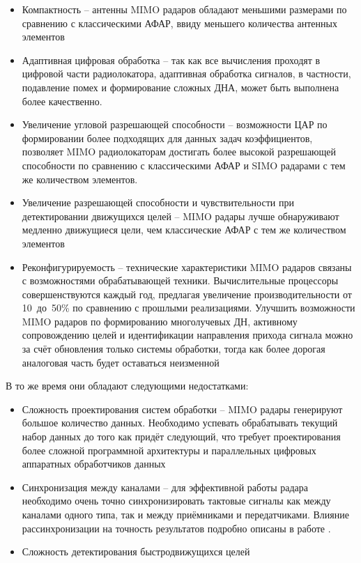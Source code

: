 \begin{itemize}
    \item Компактность -- антенны MIMO радаров обладают меньшими размерами по сравнению с классическими АФАР,
    ввиду меньшего количества антенных элементов 
    \item Адаптивная цифровая обработка -- так как все вычисления проходят в цифровой части радиолокатора, 
    адаптивная обработка сигналов, в частности, подавление помех и формирование сложных ДНА, 
    может быть выполнена более качественно. 
    \item Увеличение угловой разрешающей способности -- возможности ЦАР по формировании более подходящих 
    для данных задач коэффициентов, позволяет MIMO радиолокаторам достигать 
    более высокой разрешающей способности по сравнению с классическими АФАР и SIMO радарами с тем же количеством элементов.
    \item Увеличение разрешающей способности и чувствительности при детектировании движущихся целей -- 
    MIMO радары лучше обнаруживают медленно движущиеся цели, чем классические АФАР с тем же количеством элементов
    \item Реконфигурируемость -- технические характеристики MIMO радаров связаны с возможностями обрабатывающей 
    техники. Вычислительные процессоры совершенствуются каждый год, 
    предлагая увеличение производительности от 10~до~50\% по сравнению с прошлыми реализациями. 
    Улучшить возможности MIMO радаров по формированию многолучевых ДН, активному сопровождению целей и 
    идентификации направления прихода сигнала можно за счёт обновления только системы обработки, 
    тогда как более дорогая аналоговая часть будет оставаться неизменной
\end{itemize}

В то же время они обладают следующими недостатками:

\begin{itemize}
    \item Сложность проектирования систем обработки -- MIMO радары генерируют большое количество данных. 
    Необходимо успевать обрабатывать текущий набор данных до того как придёт следующий, 
    что требует проектирования более сложной программной архитектуры и 
    параллельных цифровых аппаратных обработчиков данных
    \item Синхронизация между каналами -- для эффективной работы радара необходимо очень точно 
    синхронизировать тактовые сигналы как между каналами одного типа, 
    так и между приёмниками и передатчиками. 
    Влияние рассинхронизации на точность результатов подробно описаны в работе \cite{bondarenko2011affection}.
    \item Сложность детектирования быстродвижущихся целей
\end{itemize}

